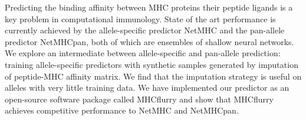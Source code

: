 Predicting the binding affinity between MHC proteins their peptide ligands is a key problem in computational immunology. State of the art performance is currently achieved by the allele-specific predictor NetMHC and the pan-allele predictor NetMHCpan, both of which are ensembles of shallow neural networks. We explore an intermediate between allele-specific and pan-allele prediction: training allele-specific predictors with synthetic samples generated by imputation of peptide-MHC affinity matrix. We find that the imputation strategy is useful on alleles with very little training data. We have implemented our predictor as an open-source software package called MHCflurry and show that MHCflurry achieves competitive performance to NetMHC and NetMHCpan.